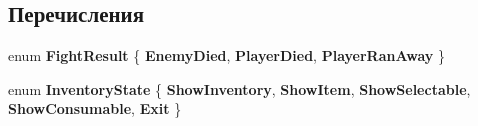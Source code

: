 \subsection*{Перечисления}
\begin{DoxyCompactItemize}
\item 
\hypertarget{namespace_a_s_c_i_i_wars_1_1_game_a26bea755310826ad76e09cc1ce0c5ecd}{}\label{namespace_a_s_c_i_i_wars_1_1_game_a26bea755310826ad76e09cc1ce0c5ecd} 
enum {\bfseries Fight\+Result} \{ {\bfseries Enemy\+Died}, 
{\bfseries Player\+Died}, 
{\bfseries Player\+Ran\+Away}
 \}
\item 
\hypertarget{namespace_a_s_c_i_i_wars_1_1_game_a38949febfe4ff7d83568273830f42e5a}{}\label{namespace_a_s_c_i_i_wars_1_1_game_a38949febfe4ff7d83568273830f42e5a} 
enum {\bfseries Inventory\+State} \{ \newline
{\bfseries Show\+Inventory}, 
{\bfseries Show\+Item}, 
{\bfseries Show\+Selectable}, 
{\bfseries Show\+Consumable}, 
\newline
{\bfseries Exit}
 \}
\end{DoxyCompactItemize}

